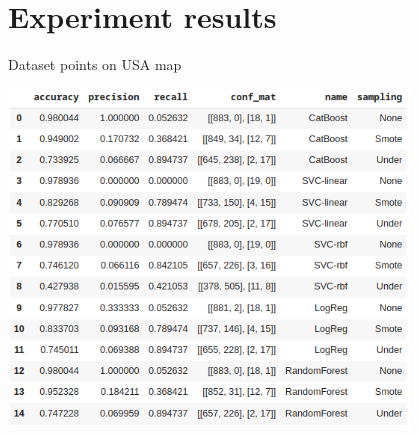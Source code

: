 \documentclass{article}
\begin{document}
\section{Experiment results}
\begin{center}
\caption{Dataset points on USA map}
\includegraphics[width=0.8\textwidth]{pivot_table.png}
\end{center}
\end{document}
